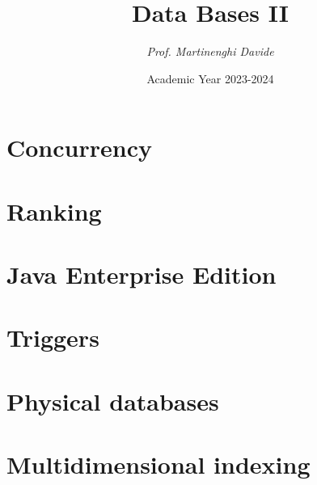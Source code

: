 \documentclass[12pt, a4paper]{report}
\title{\textbf{Data Bases II}}
\author{\textit{Prof. Martinenghi Davide}}
\date{Academic Year 2023-2024}
\begin{document}
    \maketitle

    

    \cleardoublepage

    \tableofcontents

    \cleardoublepage

    \chapter{Concurrency}
    
    
    
    
    
    
    
    
    

    \chapter{Ranking}
    
    
    
    
    
    

    \chapter{Java Enterprise Edition}
    
    
    
    
    
    
    

    \chapter{Triggers}
    
    
    
    

    \chapter{Physical databases}
        
      
      
    
    \chapter{Multidimensional indexing}
    
    
    
\end{document}

